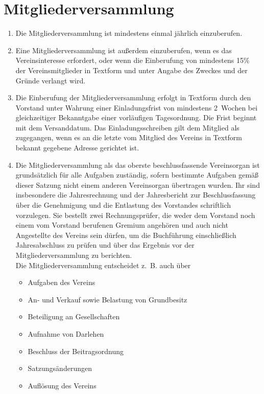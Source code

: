 \documentclass[a4paper,12pt]{scrartcl}
\begin{document}
\section{Mitgliederversammlung}
\begin{enumerate}
  \item Die Mitgliederversammlung ist mindestens einmal jährlich einzuberufen.
  \item Eine Mitgliederversammlung ist außerdem einzuberufen, wenn es das
    Vereinsinteresse erfordert, oder wenn die Einberufung von mindestens 15\%
    der Vereinsmitglieder in Textform und unter Angabe des Zweckes und der
    Gründe verlangt wird.
  \item Die Einberufung der Mitgliederversammlung erfolgt in Textform durch den
    Vorstand unter Wahrung einer Einladungsfrist von mindestens 2~Wochen bei
    gleichzeitiger Bekanntgabe einer vorläufigen Tagesordnung. Die Frist beginnt
    mit dem Versanddatum. Das Einladungsschreiben gilt dem Mitglied als
    zugegangen, wenn es an die letzte vom Mitglied des Vereins in Textform
    bekannt gegebene Adresse gerichtet ist.
  \item Die Mitgliederversammlung als das oberste beschlussfassende Vereinsorgan
    ist grundsätzlich für alle Aufgaben zuständig, sofern bestimmte Aufgaben
    gemäß dieser Satzung nicht einem anderen Vereinsorgan übertragen wurden.
    Ihr sind insbesondere die Jahresrechnung und der Jahresbericht zur
    Beschlussfassung über die Genehmigung und die Entlastung des Vorstandes
    schriftlich vorzulegen. Sie bestellt zwei Rechnungsprüfer, die weder dem
    Vorstand noch einem vom Vorstand berufenen Gremium angehören und auch nicht
    Angestellte des Vereins sein dürfen, um die Buchführung einschließlich
    Jahresabschluss zu prüfen und über das Ergebnis vor der
    Mitgliederversammlung zu berichten.\\
    Die Mitgliederversammlung entscheidet z.~B. auch über
    \begin{itemize}
      \item Aufgaben des Vereins
      \item An- und Verkauf sowie Belastung von Grundbesitz
      \item Beteiligung an Gesellschaften
      \item Aufnahme von Darlehen
      \item Beschluss der Beitragsordnung
      \item Satzungsänderungen
      \item Auflösung des Vereins

\end{itemize}
\end{enumerate}
\end{document}

